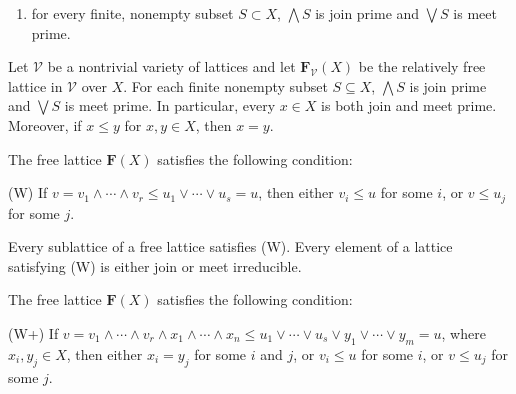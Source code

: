{\begin{lemma}
\begin{enumerate}
If $X$ satisfies condition~(\ref{eq:star2}) above, then 
\item for every finite, nonempty subset $S \subset X$, $\bigwedge S$ is join prime and $\bigvee S$ is meet prime.
\end{enumerate}
\end{lemma}

\begin{corollary}
Let $\mathcal V$ be a nontrivial variety of lattices and let $\mathbf{F}_{\mathcal V}(X)$ be the relatively free lattice in $\mathcal V$ over $X$.  For each finite nonempty subset $S \subseteq X$, $\bigwedge S$ is join prime and $\bigvee S$ is meet prime. In particular, every $x\in X$ is both join and meet prime.  Moreover, if $x\leqslant y$ for $x, y \in X$, then $x = y$.
\end{corollary}

\begin{theorem}  
The free lattice $\mathbf{F}(X)$ satisfies the following condition:

(W)  If $v = v_1 \wedge \cdots \wedge v_r \leqslant u_1 \vee \cdots \vee u_s = u$, 
then either $v_i \leqslant u$ for some $i$, or $v \leqslant u_j$ for some $j$. 
\end{theorem}

\begin{corollary}
Every sublattice of a free lattice satisfies (W). Every element of a lattice satisfying (W) is either join or meet irreducible.
\end{corollary}

\begin{theorem}  
The free lattice $\mathbf{F}(X)$ satisfies the following condition:

(W+)  If $v = v_1 \wedge \cdots \wedge v_r \wedge x_1 \wedge \cdots
\wedge x_n \leqslant u_1 \vee \cdots \vee u_s \vee
y_1 \vee \cdots \vee y_m = u$, where $x_i, y_j\in X$, then either 
$x_i = y_j$ for some $i$ and $j$, or $v_i \leqslant u$ for some $i$, or
$v \leqslant u_j$ for some $j$. 
\end{theorem}

}
